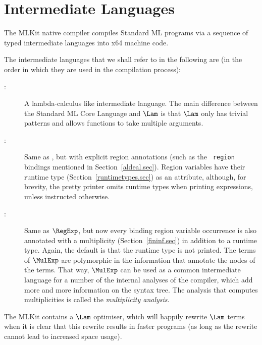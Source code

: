 \documentclass[12pt]{book}
\begin{document}
\section{Intermediate Languages}
The MLKit native compiler compiles Standard ML programs via a sequence
of typed intermediate languages into x64 machine code.

The intermediate languages that we shall refer to in the following are
(in the order in which they are used in the compilation process):
\begin{description}
\item[\Lam:]
  A lambda-calculus like intermediate language. The main difference
  between the Standard ML Core Language and $\Lam$ is that $\Lam$ only
  has trivial patterns and allows functions to take
%
%
%
  multiple arguments.
\item[\RegExp:]
  Same as \Lam, but with explicit region annotations (such as the {\tt
    region} bindings mentioned in Section~\ref{aldeal.sec}). Region
  variables have their runtime type (Section~\ref{runtimetypes.sec})
  as an attribute, although, for brevity, the pretty printer omits
  runtime types when printing expressions, unless instructed
  otherwise.
\item[\MulExp:]
  Same as $\RegExp$, but now every binding region variable occurrence
  is also annotated with a multiplicity (Section~\ref{fininf.sec}) in
  addition to a runtime type.  Again, the default is that the runtime
  type is not printed.  The terms of $\MulExp$ are polymorphic in the
  information that annotate the nodes of the terms. That way,
  $\MulExp$ can be used as a common intermediate language for a number
  of the internal analyses of the compiler, which add more and more
  information on the syntax tree.  The analysis that computes
  multiplicities is called the
  {\em multiplicity analysis}.
\end{description}

The MLKit contains a
%
$\Lam$ optimiser, which will happily rewrite $\Lam$ terms when it is
clear that this rewrite results in faster programs (as long as the
rewrite cannot lead to increased space usage).
\end{document}
